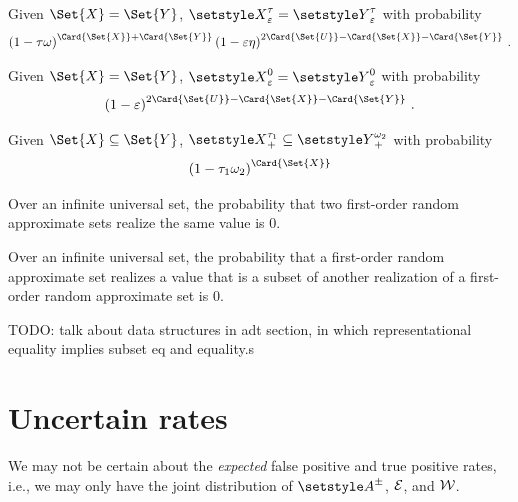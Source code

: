 \documentclass[10pt,final,hidelinks]{article}
\numberwithin{equation}{section}
\begin{document}
\begin{corollary}
	Given $\Set{X} = \Set{Y}$, $\ASet{X}[\fprate][\tprate] = \ASet{Y}[\fprate][\tprate]$ with probability
	\begin{equation}
	\left(1 - \tprate\fnrate\right)^{\Card{\Set{X}}+\Card{\Set{Y}}}
	\left(1 - \fprate\tnrate\right)^{2 \Card{\Set{U}} - \Card{\Set{X}} - \Card{\Set{Y}}}\,.
	\end{equation}
\end{corollary}


\begin{corollary}
	Given $\Set{X} = \Set{Y}$, $\ASet{X}[\fprate][0] = \ASet{Y}[\fprate][0]$ with probability
	\begin{equation}
	\left(1 - \fprate\right)^{2 \Card{\Set{U}} - \Card{\Set{X}} - \Card{\Set{Y}}}\,.
	\end{equation}
\end{corollary}

\begin{corollary}
	Given $\Set{X} \subseteq \Set{Y}$, $\ASet{X}[+][\tprate_1] \subseteq \ASet{Y}[+][\fnrate_2]$ with probability
	\begin{equation}
	\left(1 - \tprate_1\fnrate_2\right)^{\Card{\Set{X}}}
	\end{equation}
\end{corollary}




\begin{corollary}
	Over an infinite universal set, the probability that two first-order random approximate sets realize the same value is $0$.
\end{corollary}


\begin{corollary}
	Over an infinite universal set, the probability that a first-order random approximate set realizes a value that is a subset of another realization of a first-order random approximate set is $0$.
\end{corollary}

TODO: talk about data structures in adt section, in which representational equality implies subset eq and equality.s

\providecommand{\mainx}{..}
\section{Uncertain rates}
\label{sec:intervals}
We may not be certain about the \emph{expected} false positive and true positive rates, i.e., we may only have the joint distribution of $\ASet{A}$, $\mathcal{E}$, and $\mathcal{W}$.
\end{document}
